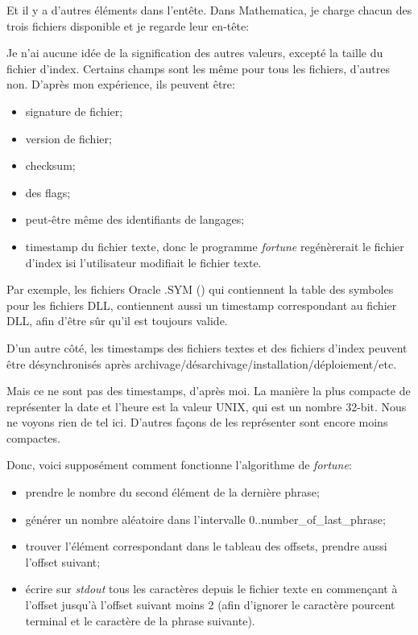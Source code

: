 Et il y a d'autres éléments dans l'entête.
Dans Mathematica, je charge chacun des trois fichiers disponible et je regarde leur en-tête:

\begin{figure}[H]
\centering
{}
\end{figure}

Je n'ai aucune idée de la signification des autres valeurs, excepté la taille du
fichier d'index.
Certains champs sont les même pour tous les fichiers, d'autres non.
D'après mon expérience, ils peuvent être:

\begin{itemize}
\item signature de fichier;
\item version de fichier;
\item checksum;
\item des flags;
\item peut-être même des identifiants de langages;
\item timestamp du fichier texte, donc le programme \emph{fortune} regénèrerait le
fichier d'index isi l'utilisateur modifiait le fichier texte.
\end{itemize}

Par exemple, les fichiers Oracle .SYM () qui contiennent
la table des symboles pour les fichiers DLL, contiennent aussi un timestamp correspondant
au fichier DLL, afin d'être sûr qu'il est toujours valide.

D'un autre côté, les timestamps des fichiers textes et des fichiers d'index peuvent
être désynchronisés après archivage/désarchivage/installation/déploiement/etc.

Mais ce ne sont pas des timestamps, d'après moi. La manière la plus compacte de représenter
la date et l'heure est la valeur UNIX, qui est un nombre 32-bit. Nous ne voyons rien
de tel ici. D'autres façons de les représenter sont encore moins compactes.

Donc, voici supposément comment fonctionne l'algorithme de \emph{fortune}:

\begin{itemize}
\item prendre le nombre du second élément de la dernière phrase;
\item générer un nombre aléatoire dans l'intervalle 0..number\_of\_last\_phrase;
\item trouver l'élément correspondant dans le tableau des offsets, prendre aussi
l'offset suivant;
\item écrire sur \emph{stdout} tous les caractères depuis le fichier texte en commençant
à l'offset jusqu'à l'offset suivant moins 2 (afin d'ignorer le caractère pourcent
terminal et le caractère de la phrase suivante).
\end{itemize}

